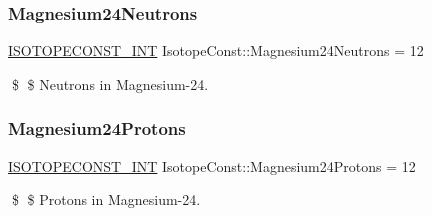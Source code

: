 \subsubsection{\texorpdfstring{Magnesium24\+Neutrons}{Magnesium24Neutrons}}
{\footnotesize\ttfamily \mbox{\hyperlink{group___isotope_const-_macros_ga5f18360b3e99483a35c32d789e62621c}{I\+S\+O\+T\+O\+P\+E\+C\+O\+N\+S\+T\+\_\+\+I\+NT}} Isotope\+Const\+::\+Magnesium24\+Neutrons = 12}

\$ \$ Neutrons in Magnesium-\/24. \mbox{\label{group___isotope_const-_magnesium-_mg24_ga5b6c944e7f5d375c84a0c69d66051458}} 
\subsubsection{\texorpdfstring{Magnesium24\+Protons}{Magnesium24Protons}}
{\footnotesize\ttfamily \mbox{\hyperlink{group___isotope_const-_macros_ga5f18360b3e99483a35c32d789e62621c}{I\+S\+O\+T\+O\+P\+E\+C\+O\+N\+S\+T\+\_\+\+I\+NT}} Isotope\+Const\+::\+Magnesium24\+Protons = 12}

\$ \$ Protons in Magnesium-\/24. 